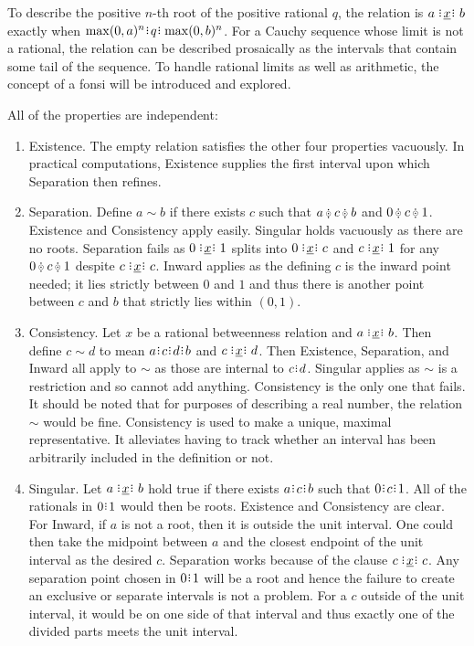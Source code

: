 \documentclass[12pt]{article}
\begin{document}
To describe the positive $n$-th root of the positive rational $q$, the relation is $a \xrel b$  exactly when $\max(0, a)^n \rint q \rint \max(0, b)^n$. For a Cauchy sequence whose limit is not a rational, the relation can be described prosaically as the intervals that contain some tail of the sequence. To handle rational limits as well as arithmetic, the concept of a fonsi will be introduced and explored. 

All of the properties are independent: 
\begin{enumerate}
    \item Existence. The empty relation satisfies the other four properties vacuously. In practical computations, Existence supplies the first interval upon which Separation then refines. 
    \item Separation. Define $a \sim b$ if there exists $c$ such that $a\betneq c \betneq b$ and $0 \betneq c \betneq 1$. Existence and Consistency apply easily. Singular holds vacuously as there are no roots. Separation fails as $0 \xrel 1$ splits into $0\xrel c$ and $c \xrel 1$ for any $0 \betneq c \betneq 1$ despite \sout{$c\xrel c$}. Inward applies as the defining $c$ is the inward point needed; it lies strictly between $0$ and $1$ and thus there is another point between $c$ and $b$ that strictly lies within $(0,1)$.
    \item Consistency. Let $x$ be a rational betweenness relation and $a \xrel b$. Then define $c \sim d$ to mean $a \rint c \rint d \rint b$ and $c \xrel d$. Then Existence, Separation, and Inward all apply to $\sim$ as those are internal to $c \rint d$. Singular applies as $\sim$ is a restriction and so cannot add anything. Consistency is the only one that fails. It should be noted that for purposes of describing a real number, the relation $\sim$ would be fine. Consistency is used to make a unique, maximal representative. It alleviates having to track whether an interval has been arbitrarily included in the definition or not. 
    \item Singular. Let $a \xrel b$ hold true if there exists $a \rint c \rint b$ such that $0 \rint c \rint 1$. All of the rationals in $0\rint 1$ would then be roots. Existence and Consistency are clear. For Inward, if $a$ is not a root, then it is outside the unit interval. One could then take the midpoint between $a$ and the closest endpoint of the unit interval as the desired $c$. Separation works because of the clause $c \xrel c$. Any separation point chosen in $0 \rint 1$ will be a root and hence the failure to create an exclusive or separate intervals is not a problem. For a $c$ outside of the unit interval, it would be on one side of that interval and thus exactly one of the divided parts meets the unit interval. 

\end{enumerate}
\end{document}
